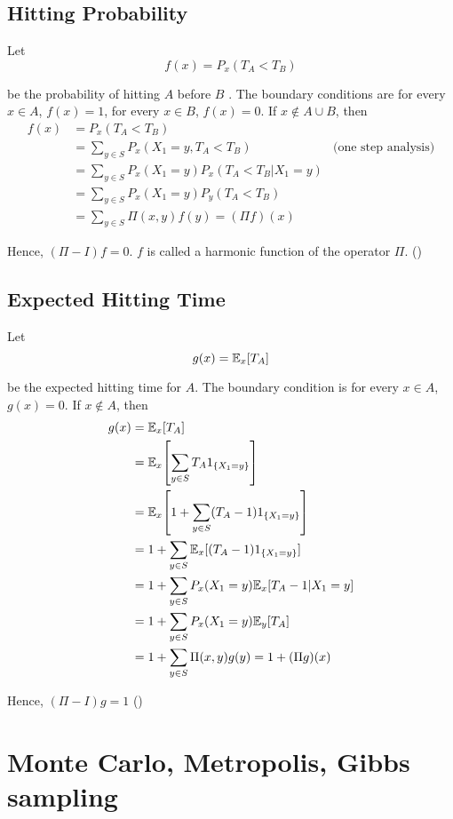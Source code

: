 \documentclass{report}
\begin{document}
\subsection{Hitting Probability}

Let
$$
	f(x) = P_x(T_A < T_B)
$$

be the probability of hitting $A$ before $B$ . The boundary conditions are for every $x \in A$, $f(x) = 1$, for every $x \in B$, $f(x) = 0$. If $x \notin A \cup B$, then
\begin{align*}
	f(x)
	&= P_x(T_A < T_B) \\
	&= \sum_{y \in S} P_x(X_1 = y, T_A < T_B) &\text{(one step analysis)} \\
	&= \sum_{y \in S} P_x(X_1 = y) P_x(T_A < T_B | X_1 = y) \\
	&= \sum_{y \in S} P_x(X_1 = y) P_y(T_A < T_B) \\
	&= \sum_{y \in S} \Pi(x, y) f(y) = (\Pi f)(x)
\end{align*}

Hence, $(\Pi - I) f = 0$. $f$ is called a harmonic function of the operator $\Pi$. ()

\subsection{Expected Hitting Time}

Let 
$$
	g(x) = \mathbb{E}_x[T_A]
$$

be the expected hitting time for $A$. The boundary condition is for every $x \in A$, $g(x) = 0$. If $x \notin A$, then
\begin{align*}
	g(x)
	&= \Exp_x[T_A] \\
	&= \Exp_x\bracket*{\sum_{y \in S} T_A 1_{\set{X_1 = y}}} \\
	&= \Exp_x\bracket*{1 + \sum_{y \in S} (T_A - 1) 1_{\set{X_1 = y}}} \\
	&= 1 + \sum_{y \in S} \Exp_x[(T_A - 1) 1_{\set{X_1 = y}}] \\
	&= 1 + \sum_{y \in S} P_x(X_1 = y) \Exp_x[T_A - 1 | X_1 = y] \\
	&= 1 + \sum_{y \in S} P_x(X_1 = y) \Exp_y[T_A] \\
	&= 1 + \sum_{y \in S} \Pi(x, y) g(y) = 1 + (\Pi g)(x)
\end{align*}

Hence, $(\Pi - I) g = 1$ ()

\section{Monte Carlo, Metropolis, Gibbs sampling}
\end{document}
